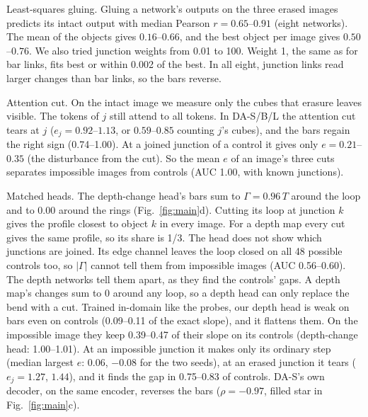 \documentclass[10pt,twocolumn,letterpaper]{article}
\makeatletter
\renewcommand\paragraph{\@startsection{paragraph}{4}{\z@}{1.1ex \@plus.4ex \@minus.2ex}{-1em}%
  {\normalfont\normalsize\bfseries}}
\makeatother
\begin{document}
\paragraph{Least-squares gluing.}
Gluing a network's outputs on the three erased images predicts its intact output with median Pearson $r=0.65$--$0.91$
(eight networks). The mean of the objects gives $0.16$--$0.66$, and the best object per image gives $0.50$--$0.76$. We
also tried junction weights from 0.01 to 100. Weight 1, the same as for bar links, fits best or within 0.002 of the
best. In all eight, junction links read larger changes than bar links, so the bars reverse.

\paragraph{Attention cut.}
On the intact image we measure only the cubes that erasure leaves visible. The tokens of $j$ still attend to all tokens. In \mbox{DA-S/B/L} the attention cut tears at $j$ (\mbox{$e_j=0.92$--$1.13$}, or $0.59$--$0.85$ counting $j$'s cubes),
and the bars regain the right sign \mbox{(0.74--1.00)}. At a joined junction of a control it gives only \mbox{$e=0.21$--$0.35$} (the
disturbance from the cut). So the mean $e$ of an image's three cuts separates impossible images from controls (AUC
1.00, with known junctions).

\paragraph{Matched heads.}
The depth-change head's bars sum to $\Gamma=0.96\,T$ around the loop and to $0.00$ around the rings
(Fig.~\ref{fig:main}d). Cutting its loop at junction $k$ gives the profile closest to object $k$ in every image. For a
depth map every cut gives the same profile, so its share is 1/3. The head does not show which junctions are joined.
Its edge channel leaves the loop closed on all 48 possible controls too, so $|\Gamma|$ cannot tell them from
impossible images (AUC 0.56--0.60). The depth networks tell them apart, as they find the controls' gaps. A depth map's
changes sum to 0 around any loop, so a depth head can only replace the bend with a cut. Trained in-domain like the
probes, our depth head is weak on bars even on controls (0.09--0.11 of the exact slope), and it flattens them. On the
impossible image they keep 0.39--0.47 of their slope on its controls (depth-change head: 1.00--1.01). At an impossible junction it makes only its ordinary step (median largest $e$: $0.06$, $-0.08$ for the
two seeds), at an erased junction it tears ($e_j=1.27$, $1.44$), and it finds the gap in 0.75--0.83 of controls.
DA-S's own decoder, on the same encoder, reverses the bars ($\rho=-0.97$, filled star in Fig.~\ref{fig:main}c).
\end{document}
